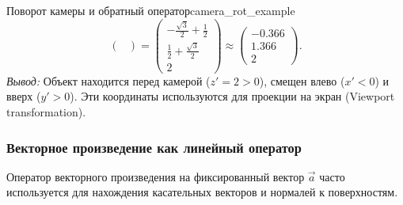 \documentclass[12pt,a4paper]{article}
\begin{document}
\begin{definition}{Поворот камеры и обратный оператор}{camera_rot_example}
\[\begin{pmatrix}
      \end{pmatrix} =
      \begin{pmatrix} -\frac{\sqrt{3}}{2} + \frac{1}{2}
        \\ \frac{1}{2} + \frac{\sqrt{3}}{2} \\ 2
      \end{pmatrix} \approx
      \begin{pmatrix} -0.366 \\ 1.366 \\ 2
      \end{pmatrix}.
    \]
    \textit{Вывод:} Объект находится перед камерой ($z'=2 > 0$),
    смещен влево ($x' < 0$) и вверх ($y' > 0$). Эти координаты
    используются для проекции на экран (Viewport transformation).
  \end{definition}

  \subsubsection*{Векторное произведение как линейный оператор}

  Оператор векторного произведения на фиксированный вектор $\vec{a}$
  часто используется для нахождения касательных векторов и нормалей к
  поверхностям.
\end{document}
